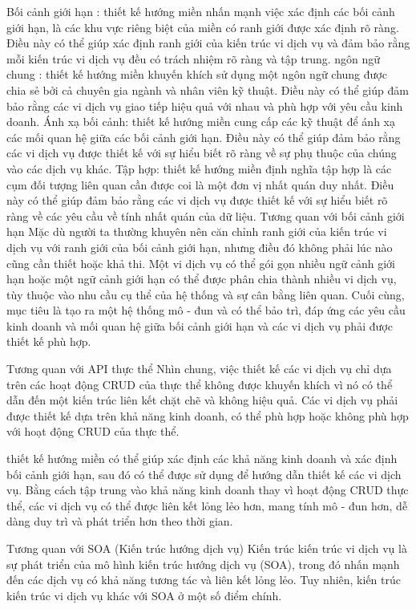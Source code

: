 Bối cảnh giới hạn : thiết kế hướng miền nhấn mạnh việc xác định các bối cảnh giới hạn, là các khu vực riêng biệt của miền có ranh giới được xác định rõ ràng. Điều này có thể giúp xác định ranh giới của kiến trúc vi dịch vụ và đảm bảo rằng mỗi kiến trúc vi dịch vụ đều có trách nhiệm rõ ràng và tập trung.
ngôn ngữ chung : thiết kế hướng miền khuyến khích sử dụng một ngôn ngữ chung được chia sẻ bởi cả chuyên gia ngành và nhân viên kỹ thuật. Điều này có thể giúp đảm bảo rằng các vi dịch vụ giao tiếp hiệu quả với nhau và phù hợp với yêu cầu kinh doanh.
Ánh xạ bối cảnh: thiết kế hướng miền cung cấp các kỹ thuật để ánh xạ các mối quan hệ giữa các bối cảnh giới hạn. Điều này có thể giúp đảm bảo rằng các vi dịch vụ được thiết kế với sự hiểu biết rõ ràng về sự phụ thuộc của chúng vào các dịch vụ khác.
Tập hợp: thiết kế hướng miền định nghĩa tập hợp là các cụm đối tượng liên quan cần được coi là một đơn vị nhất quán duy nhất. Điều này có thể giúp đảm bảo rằng các vi dịch vụ được thiết kế với sự hiểu biết rõ ràng về các yêu cầu về tính nhất quán của dữ liệu.
Tương quan với bối cảnh giới hạn
Mặc dù người ta thường khuyên nên căn chỉnh ranh giới của kiến trúc vi dịch vụ với ranh giới của bối cảnh giới hạn, nhưng điều đó không phải lúc nào cũng cần thiết hoặc khả thi. Một vi dịch vụ có thể gói gọn nhiều ngữ cảnh giới hạn hoặc một ngữ cảnh giới hạn có thể được phân chia thành nhiều vi dịch vụ, tùy thuộc vào nhu cầu cụ thể của hệ thống và sự cân bằng liên quan. Cuối cùng, mục tiêu là tạo ra một hệ thống mô - đun và có thể bảo trì, đáp ứng các yêu cầu kinh doanh và mối quan hệ giữa bối cảnh giới hạn và các vi dịch vụ phải được thiết kế phù hợp.

Tương quan với API thực thể
Nhìn chung, việc thiết kế các vi dịch vụ chỉ dựa trên các hoạt động CRUD của thực thể không được khuyến khích vì nó có thể dẫn đến một kiến trúc liên kết chặt chẽ và không hiệu quả. Các vi dịch vụ phải được thiết kế dựa trên khả năng kinh doanh, có thể phù hợp hoặc không phù hợp với hoạt động CRUD của thực thể.

thiết kế hướng miền có thể giúp xác định các khả năng kinh doanh và xác định bối cảnh giới hạn, sau đó có thể được sử dụng để hướng dẫn thiết kế các vi dịch vụ. Bằng cách tập trung vào khả năng kinh doanh thay vì hoạt động CRUD thực thể, các vi dịch vụ có thể được liên kết lỏng lẻo hơn, mang tính mô - đun hơn, dễ dàng duy trì và phát triển hơn theo thời gian.

Tương quan với SOA (Kiến trúc hướng dịch vụ)
Kiến trúc kiến trúc vi dịch vụ là sự phát triển của mô hình kiến trúc hướng dịch vụ (SOA), trong đó nhấn mạnh đến các dịch vụ có khả năng tương tác và liên kết lỏng lẻo. Tuy nhiên, kiến trúc kiến trúc vi dịch vụ khác với SOA ở một số điểm chính.

